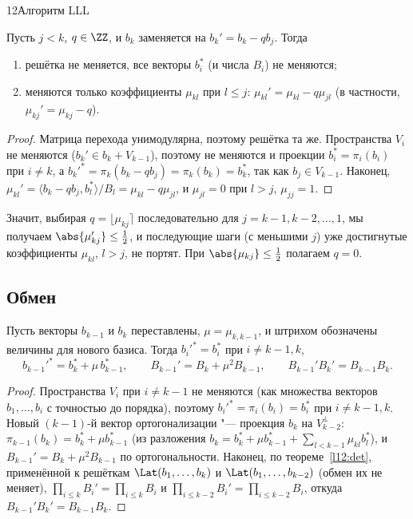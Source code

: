 \begin{lecture}{12}{Алгоритм LLL}
\begin{lemma}\label{l12:sizered}
Пусть $j < k$, $q \in \ZZ$, и $b_k$ заменяется на $b_k' = b_k - q b_j$. Тогда
\begin{enumerate}
  \item решётка не меняется, все векторы $b_i^*$ (и числа $B_i$) не меняются;
  \item меняются только коэффициенты $\mu_{k l}$ при $l \le j$:
    $\mu_{kl}' = \mu_{kl} - q \mu_{jl}$ (в частности, $\mu_{kj}' = \mu_{kj} - q$).
\end{enumerate}
\end{lemma}

\begin{proof}
Матрица перехода унимодулярна, поэтому решётка та же. Пространства $V_i$ не меняются
($b_k' \in b_k + V_{k-1}$), поэтому не меняются и проекции $b_i^* = \pi_i(b_i)$ при $i \ne k$, а
$b_k'^* = \pi_k(b_k - q b_j) = \pi_k(b_k) = b_k^*$, так как $b_j \in V_{k-1}$. Наконец,
$\mu_{kl}' = \langle b_k - q b_j, b_l^*\rangle / B_l = \mu_{kl} - q \mu_{jl}$, и
$\mu_{jl} = 0$ при $l > j$, $\mu_{jj} = 1$.
\end{proof}

Значит, выбирая $q = \lfloor \mu_{kj} \rceil$ последовательно для $j = k - 1, k - 2, \dots, 1$,
мы получаем $\abs{\mu_{kj}'} \le \frac12$, и последующие шаги (с меньшими $j$) уже достигнутые
коэффициенты $\mu_{kl}$, $l > j$, не портят. При $\abs{\mu_{kj}} \le \frac12$ полагаем $q = 0$.

\subsection{Обмен}

\begin{lemma}\label{l12:swap}
Пусть векторы $b_{k-1}$ и $b_k$ переставлены, $\mu = \mu_{k,k-1}$, и штрихом обозначены
величины для нового базиса. Тогда $b_i'^* = b_i^*$ при $i \ne k-1, k$,
\[
  b_{k-1}'^* = b_k^* + \mu\, b_{k-1}^*, \qquad B_{k-1}' = B_k + \mu^2 B_{k-1}, \qquad
  B_{k-1}' B_k' = B_{k-1} B_k .
\]
\end{lemma}

\begin{proof}
Пространства $V_i$ при $i \ne k-1$ не меняются (как множества векторов $b_1, \dots, b_i$
с точностью до порядка), поэтому $b_i'^* = \pi_i(b_i) = b_i^*$ при $i \ne k-1, k$. Новый
$(k-1)$-й вектор ортогонализации "--- проекция $b_k$ на $V_{k-2}^\perp$:
$\pi_{k-1}(b_k) = b_k^* + \mu b_{k-1}^*$ (из разложения $b_k = b_k^* + \mu b_{k-1}^* +
\sum_{l < k-1} \mu_{kl} b_l^*$), и $B_{k-1}' = B_k + \mu^2 B_{k-1}$ по ортогональности.
Наконец, по теореме~\ref{l12:det}, применённой к решёткам $\Lat(b_1, \dots, b_k)$ и
$\Lat(b_1, \dots, b_{k-2})$ (обмен их не меняет), $\prod_{i \le k} B_i' = \prod_{i \le k} B_i$
и $\prod_{i \le k - 2} B_i' = \prod_{i \le k-2} B_i$, откуда $B_{k-1}'B_k' = B_{k-1}B_k$.
\end{proof}


\end{lecture}
